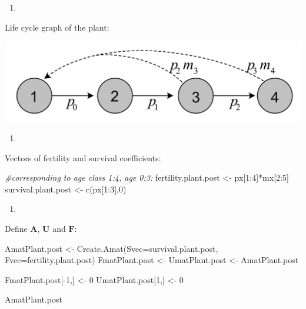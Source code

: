 \documentclass[
]{book}
\newenvironment{Shaded}{\begin{snugshade}}{\end{snugshade}}
\newcommand{\AttributeTok}[1]{\textcolor[rgb]{0.77,0.63,0.00}{#1}}
\newcommand{\CommentTok}[1]{\textcolor[rgb]{0.56,0.35,0.01}{\textit{#1}}}
\newcommand{\DecValTok}[1]{\textcolor[rgb]{0.00,0.00,0.81}{#1}}
\newcommand{\FunctionTok}[1]{\textcolor[rgb]{0.00,0.00,0.00}{#1}}
\newcommand{\NormalTok}[1]{#1}
\newcommand{\OtherTok}[1]{\textcolor[rgb]{0.56,0.35,0.01}{#1}}
\newcommand{\SpecialCharTok}[1]{\textcolor[rgb]{0.00,0.00,0.00}{#1}}
\providecommand{\tightlist}{%
  \setlength{\itemsep}{0pt}\setlength{\parskip}{0pt}}
\begin{document}
\begin{enumerate}
\def\labelenumi{\arabic{enumi}.}
\tightlist
\item
\end{enumerate}

Life cycle graph of the plant:

\includegraphics[width=0.6\linewidth]{LifeCyclePlantPost}

\begin{enumerate}
\def\labelenumi{\arabic{enumi}.}
\setcounter{enumi}{1}
\tightlist
\item
\end{enumerate}

Vectors of fertility and survival coefficients:

\begin{Shaded}
\begin{Highlighting}[]
\CommentTok{\#corresponding to age class 1:4, age 0:3:}
\NormalTok{fertility.plant.post }\OtherTok{\textless{}{-}}\NormalTok{ px[}\DecValTok{1}\SpecialCharTok{:}\DecValTok{4}\NormalTok{]}\SpecialCharTok{*}\NormalTok{mx[}\DecValTok{2}\SpecialCharTok{:}\DecValTok{5}\NormalTok{] }
\NormalTok{survival.plant.post }\OtherTok{\textless{}{-}} \FunctionTok{c}\NormalTok{(px[}\DecValTok{1}\SpecialCharTok{:}\DecValTok{3}\NormalTok{],}\DecValTok{0}\NormalTok{) }
\end{Highlighting}
\end{Shaded}

\begin{enumerate}
\def\labelenumi{\arabic{enumi}.}
\setcounter{enumi}{2}
\tightlist
\item
\end{enumerate}

Define \(\mathbf{A}\), \(\mathbf{U}\) and \(\mathbf{F}\):

\begin{Shaded}
\begin{Highlighting}[]
\NormalTok{AmatPlant.post }\OtherTok{\textless{}{-}} \FunctionTok{Create.Amat}\NormalTok{(}\AttributeTok{Svec=}\NormalTok{survival.plant.post,}
                              \AttributeTok{Fvec=}\NormalTok{fertility.plant.post)}
\NormalTok{FmatPlant.post }\OtherTok{\textless{}{-}} 
\NormalTok{  UmatPlant.post }\OtherTok{\textless{}{-}}\NormalTok{ AmatPlant.post}

\NormalTok{FmatPlant.post[}\SpecialCharTok{{-}}\DecValTok{1}\NormalTok{,] }\OtherTok{\textless{}{-}} \DecValTok{0}
\NormalTok{UmatPlant.post[}\DecValTok{1}\NormalTok{,] }\OtherTok{\textless{}{-}} \DecValTok{0}  

\NormalTok{AmatPlant.post}
\end{Highlighting}
\end{Shaded}
\end{document}
